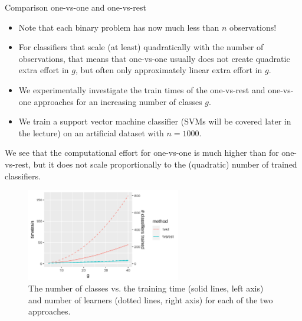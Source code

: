 \begin{vbframe}{Comparison one-vs-one and one-vs-rest}
\begin{itemize}
       \item Note that each binary problem has now much less than $n$ observations! 
    \item For classifiers that scale (at least) quadratically with the number of observations, that means that one-vs-one usually does not create quadratic extra effort in $g$, but often only approximately linear extra effort in $g$.
    \item We experimentally investigate the train times of the one-vs-rest and one-vs-one approaches for an increasing number of classes $g$. 
    \item We train a support vector machine classifier (SVMs will be covered later in the lecture) on an artificial dataset with $n = 1000$. 
  \end{itemize}
    \framebreak 
    We see that the computational effort for one-vs-one is much higher than for one-vs-rest, but it does not scale proportionally to the (quadratic) number of trained classifiers. 
    \begin{center}
    \begin{figure}
    \includegraphics[width=0.6\textwidth]{figure_man/onevsone_vs_onevsrest.png}
    \caption{The number of classes vs. the training time (solid lines, left axis) and number of learners (dotted lines, right axis) for each of the two approaches.}
    \end{figure}
    \end{center}


  \end{vbframe}

\endlecture

